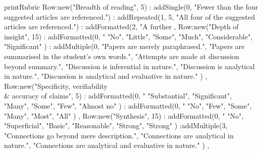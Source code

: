 \documentclass{../../fal_assignment}
\begin{document}
\renewcommand{\refname}{Papers}
\nocite{*}



%

\begin{luacode*}
	printRubric {
		Row:new("Breadth of reading", 5)
			: addSingle(0, "Fewer than the four suggested articles are referenced.")
			: addRepeated(1, 5, "All four of the suggested articles are referenced.")
			: addFormatted(2, "A further %
		,
		Row:new("Depth of insight", 15)
			: addFormatted(0, "%
				{ "No", "Little", "Some", "Much", "Considerable", "Significant" })
			: addMultiple(0, {
				"Papers are merely paraphrased.",
				"Papers are summarised in the student's own words.",
				"Attempts are made at discussion beyond summary.",
				"Discussion is inferential in nature.",
				"Discussion is analytical in nature.",
				"Discussion is analytical and evaluative in nature." })
		,
		Row:new("Specificity, verifiability \\& accuracy of claims", 5)
			: addFormatted(0, "%
				{ "Substantial", "Significant", "Many", "Some", "Few", "Almost no" })
			: addFormatted(0, "%
				{ "No", "Few", "Some", "Many", "Most", "All" })
		,
		Row:new("Synthesis", 15)
			: addFormatted(0, "%
				{ "No", "Superficial", "Basic", "Reasonable", "Strong", "Strong" })
			:addMultiple(3, {
				"Connections go beyond mere description.",
				"Connections are analytical in nature.",
				"Connections are analytical and evaluative in nature." })
		,
	}
\end{luacode*}
\end{document}
